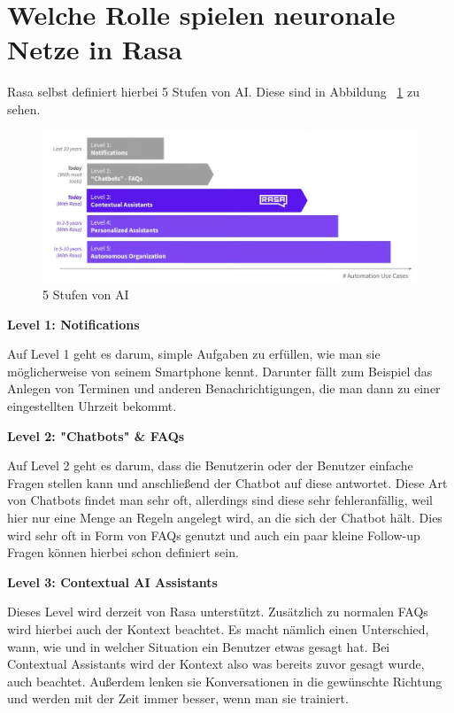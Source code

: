 \section{Welche Rolle spielen neuronale Netze in Rasa}\label{sec:neural-networks}

Rasa selbst definiert hierbei 5 Stufen von AI.
Diese sind in Abbildung ~\ref{fig:5_levels_of_ai} zu sehen\@.\cite{ai5Levels}

\begin{figure}[hbt!]
    \centering
    \includegraphics[scale=0.4]{pics/5_levels_of_ai}
    \caption{5 Stufen von AI~\cite{ai5LevelsVideo}}
    \label{fig:5_levels_of_ai}
\end{figure}

\textbf{Level 1: Notifications}

Auf Level 1 geht es darum, simple Aufgaben zu erfüllen, wie man sie möglicherweise von seinem Smartphone kennt.
Darunter fällt zum Beispiel das Anlegen von Terminen und anderen Benachrichtigungen, die man dann zu einer eingestellten Uhrzeit bekommt.\cite{rasaMasterclass5Levels,ai5Levels,ai5LevelsVideo}

\textbf{Level 2: "Chatbots" \& FAQs}

Auf Level 2 geht es darum, dass die Benutzerin oder der Benutzer einfache Fragen stellen kann und anschließend der Chatbot auf diese antwortet.
Diese Art von Chatbots findet man sehr oft, allerdings sind diese sehr fehleranfällig, weil hier nur eine Menge an Regeln angelegt wird, an die sich der Chatbot hält.
Dies wird sehr oft in Form von FAQs genutzt und auch ein paar kleine Follow-up Fragen können hierbei schon definiert sein.\cite{rasaMasterclass5Levels,ai5Levels,ai5LevelsVideo}

\textbf{Level 3: Contextual AI Assistants}

Dieses Level wird derzeit von Rasa unterstützt.
Zusätzlich zu normalen FAQs wird hierbei auch der Kontext beachtet.
Es macht nämlich einen Unterschied, wann, wie und in welcher Situation ein Benutzer etwas gesagt hat.
Bei Contextual Assistants wird der Kontext also was bereits zuvor gesagt wurde, auch beachtet.
Außerdem lenken sie Konversationen in die gewünschte Richtung und werden mit der Zeit immer besser, wenn man sie trainiert.\cite{rasaMasterclass5Levels,ai5Levels,ai5LevelsVideo}

